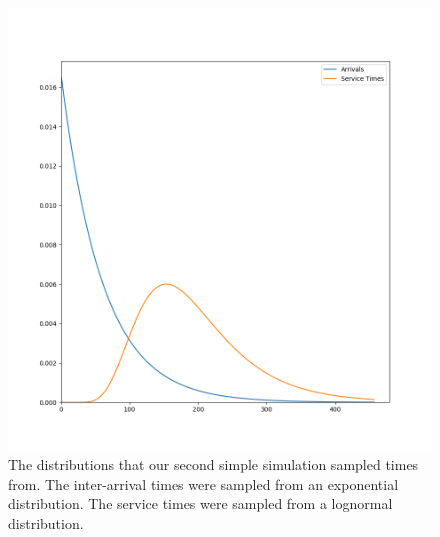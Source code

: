 \begin{figure}[h]
  \includegraphics[width=\textwidth]{figures/montecarlo/expon_lognorm.png}
  \caption{
    The distributions that our second simple simulation sampled times from.
    The inter-arrival times were sampled from an exponential distribution.
    The service times were sampled from a lognormal distribution.
  }\label{fig:simple_sim2_dists}
\end{figure}

